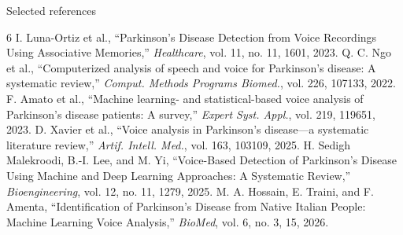 \documentclass[aspectratio=169,10pt]{beamer}
\begin{document}
\begin{frame}{Selected references}
\footnotesize
\begin{thebibliography}{6}
 I. Luna-Ortiz et al., ``Parkinson's Disease Detection from Voice Recordings Using Associative Memories,'' \emph{Healthcare}, vol. 11, no. 11, 1601, 2023.
 Q. C. Ngo et al., ``Computerized analysis of speech and voice for Parkinson's disease: A systematic review,'' \emph{Comput. Methods Programs Biomed.}, vol. 226, 107133, 2022.
 F. Amato et al., ``Machine learning- and statistical-based voice analysis of Parkinson's disease patients: A survey,'' \emph{Expert Syst. Appl.}, vol. 219, 119651, 2023.
 D. Xavier et al., ``Voice analysis in Parkinson's disease---a systematic literature review,'' \emph{Artif. Intell. Med.}, vol. 163, 103109, 2025.
 H. Sedigh Malekroodi, B.-I. Lee, and M. Yi, ``Voice-Based Detection of Parkinson's Disease Using Machine and Deep Learning Approaches: A Systematic Review,'' \emph{Bioengineering}, vol. 12, no. 11, 1279, 2025.
 M. A. Hossain, E. Traini, and F. Amenta, ``Identification of Parkinson's Disease from Native Italian People: Machine Learning Voice Analysis,'' \emph{BioMed}, vol. 6, no. 3, 15, 2026.
\end{thebibliography}
\end{frame}
\end{document}
